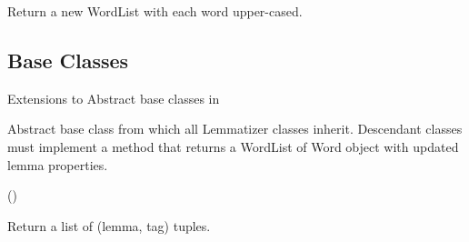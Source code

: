 \documentclass[letterpaper,10pt,english]{sphinxmanual}
\begin{document}
\begin{fulllineitems}
\begin{fulllineitems}
\end{fulllineitems}


\begin{fulllineitems}
\label{api_reference:textblob_de.blob.WordList.sort}
\end{fulllineitems}


\begin{fulllineitems}
\label{api_reference:textblob_de.blob.WordList.upper}
Return a new WordList with each word upper-cased.

\end{fulllineitems}


\end{fulllineitems}



\subsection{Base Classes}
\label{api_reference:api-base-classes}\label{api_reference:base-classes}\label{api_reference:module-textblob_de.base}
Extensions to Abstract base classes in 

\begin{fulllineitems}
\label{api_reference:textblob_de.base.BaseLemmatizer}
Abstract base class from which all Lemmatizer classes inherit.
Descendant classes must implement a  method that returns
a WordList of Word object with updated lemma properties.

()

\begin{fulllineitems}
\label{api_reference:textblob_de.base.BaseLemmatizer.lemmatize}
Return a list of (lemma, tag) tuples.

\end{fulllineitems}


\end{fulllineitems}
\end{document}
